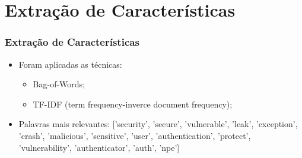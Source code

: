 \section[Extração de Características]{Extração de Características}

\begin{frame}[fragile]
  \frametitle{Extração de Características}
  \begin{itemize}
    \item Foram aplicadas as técnicas:
          \begin{itemize}
            \item Bag-of-Words;
            \item TF-IDF (term frequency-inverce document frequency);
          \end{itemize}
    \item Palavras mais relevantes: ['security', 'secure', 'vulnerable', 'leak', 'exception', 'crash', 'malicious',
          'sensitive', 'user', 'authentication', 'protect', 'vulnerability', 'authenticator', 'auth', 'npe']
  \end{itemize}
\end{frame}